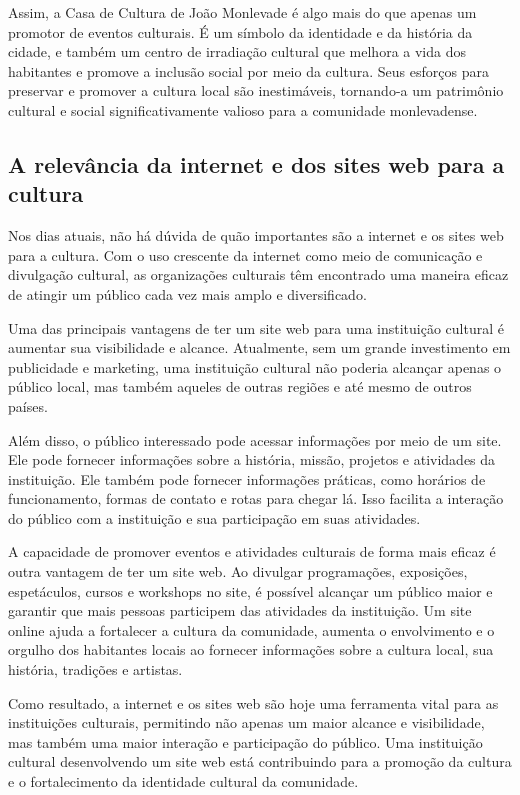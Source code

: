 Assim, a Casa de Cultura de João Monlevade é algo mais do que apenas um promotor de eventos culturais. É um símbolo da identidade e da história da cidade, e também um centro de irradiação cultural que melhora a vida dos habitantes e promove a inclusão social por meio da cultura. Seus esforços para preservar e promover a cultura local são inestimáveis, tornando-a um patrimônio cultural e social significativamente valioso para a comunidade monlevadense.


\subsection{A relevância da internet e dos sites web para a cultura}
Nos dias atuais, não há dúvida de quão importantes são a internet e os sites web para a cultura. Com o uso crescente da internet como meio de comunicação e divulgação cultural, as organizações culturais têm encontrado uma maneira eficaz de atingir um público cada vez mais amplo e diversificado.

Uma das principais vantagens de ter um site web para uma instituição cultural é aumentar sua visibilidade e alcance. Atualmente, sem um grande investimento em publicidade e marketing, uma instituição cultural não poderia alcançar apenas o público local, mas também aqueles de outras regiões e até mesmo de outros países.

Além disso, o público interessado pode acessar informações por meio de um site. Ele pode fornecer informações sobre a história, missão, projetos e atividades da instituição. Ele também pode fornecer informações práticas, como horários de funcionamento, formas de contato e rotas para chegar lá. Isso facilita a interação do público com a instituição e sua participação em suas atividades.

A capacidade de promover eventos e atividades culturais de forma mais eficaz é outra vantagem de ter um site web. Ao divulgar programações, exposições, espetáculos, cursos e workshops no site, é possível alcançar um público maior e garantir que mais pessoas participem das atividades da instituição. Um site online ajuda a fortalecer a cultura da comunidade, aumenta o envolvimento e o orgulho dos habitantes locais ao fornecer informações sobre a cultura local, sua história, tradições e artistas.

Como resultado, a internet e os sites web são hoje uma ferramenta vital para as instituições culturais, permitindo não apenas um maior alcance e visibilidade, mas também uma maior interação e participação do público. Uma instituição cultural desenvolvendo um site web está contribuindo para a promoção da cultura e o fortalecimento da identidade cultural da comunidade.

